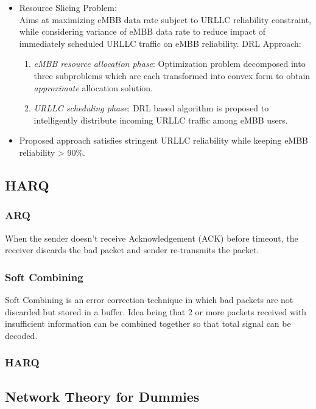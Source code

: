 \documentclass[11pt]{article}
\begin{document}
\begin{itemize}
\item Resource Slicing Problem: \\
Aims at maximizing eMBB data rate subject to URLLC reliability constraint, while considering variance of eMBB data rate to reduce impact of immediately scheduled URLLC traffic on eMBB reliability. DRL Approach:
\begin{enumerate}
\item \emph{eMBB resource allocation phase}: Optimization problem decomposed into three subproblems which are each transformed into convex form to obtain \emph{approximate} allocation solution.
\item \emph{URLLC scheduling phase}: DRL based algorithm is proposed to intelligently distribute incoming URLLC traffic among eMBB users.
\end{enumerate}
\item Proposed approach satisfies stringent URLLC reliability while keeping eMBB reliability > 90\%.
\end{itemize}
\subsection{HARQ}
\label{sec:org4fd2e7d}
\subsubsection{ARQ}
\label{sec:orgb454535}
When the  sender doesn’t receive Acknowledgement (ACK) before timeout, the receiver discards the bad packet and sender re-transmits the packet.
\subsubsection{Soft Combining}
\label{sec:org5d3d276}
Soft Combining is an error correction technique in which bad packets are not discarded but stored in a buffer. Idea being that 2 or more packets received with insufficient information can be combined together so that total signal can be decoded.
\subsubsection{HARQ}
\label{sec:org8a8cdb8}
\subsection{Network Theory for Dummies}
\label{sec:org6151f6a}
\end{document}
